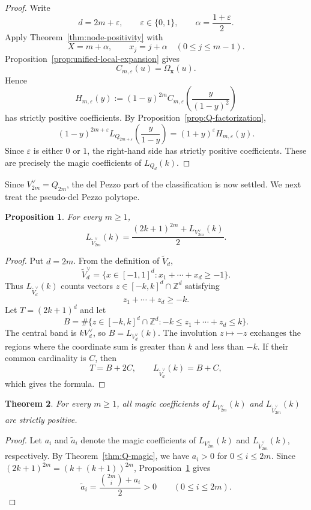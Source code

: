 \documentclass[10pt,a4paper]{amsart}
\newtheorem{Theorem}{Theorem}[section]
\newtheorem{Proposition}[Theorem]{Proposition}
\theoremstyle{definition}
\newcommand{\ZZ}{\mathbb Z}
\begin{document}
\begin{proof}
Write
\[
d=2m+\varepsilon,
\qquad
\varepsilon\in\{0,1\},
\qquad
\alpha=\frac{1+\varepsilon}{2}.
\]
Apply Theorem~\ref{thm:node-positivity} with
\[
X=m+\alpha,
\qquad
x_j=j+\alpha
\quad(0\le j\le m-1).
\]
Proposition~\ref{prop:unified-local-expansion} gives
\[
C_{m,\varepsilon}(u)=\Omega_{\mathbf x}(u).
\]
Hence
\[
H_{m,\varepsilon}(y)
:=
(1-y)^{2m}
C_{m,\varepsilon}\left(\frac{y}{(1-y)^2}\right)
\]
has strictly positive coefficients.  By
Proposition~\ref{prop:Q-factorization},
\[
(1-y)^{2m+\varepsilon}
L_{Q_{2m+\varepsilon}}\left(\frac{y}{1-y}\right)
=
(1+y)^\varepsilon
H_{m,\varepsilon}(y).
\]
Since $\varepsilon$ is either $0$ or $1$, the right-hand side has strictly
positive coefficients.  These are precisely the magic coefficients of
$L_{Q_d}(k)$.
\end{proof}

Since $V_{2m}^\vee=Q_{2m}$, the del Pezzo part of the classification is now
settled.  We next treat the pseudo-del Pezzo polytope.

\begin{Proposition}\label{prop:pseudo-average}
For every $m\ge1$,
\[
L_{\widetilde V_{2m}^\vee}(k)
=
\frac{(2k+1)^{2m}+L_{V_{2m}^\vee}(k)}2.
\]
\end{Proposition}

\begin{proof}
Put $d=2m$.  From the definition of $\widetilde V_d$,
\[
\widetilde V_d^\vee
=
\{x\in[-1,1]^d:x_1+\cdots+x_d\ge-1\}.
\]
Thus $L_{\widetilde V_d^\vee}(k)$ counts vectors
$z\in[-k,k]^d\cap\ZZ^d$ satisfying
\[
z_1+\cdots+z_d\ge-k.
\]
Let $T=(2k+1)^d$ and let
\[
B
=
\#\{z\in[-k,k]^d\cap\ZZ^d:
-k\le z_1+\cdots+z_d\le k\}.
\]
The central band is $kV_d^\vee$, so $B=L_{V_d^\vee}(k)$.  The involution
$z\mapsto-z$ exchanges the regions where the coordinate sum is greater
than $k$ and less than $-k$.  If their common cardinality is $C$, then
\[
T=B+2C,
\qquad
L_{\widetilde V_d^\vee}(k)=B+C,
\]
which gives the formula.
\end{proof}

\begin{Theorem}\label{thm:building-blocks}
For every $m\ge1$, all magic coefficients of
$L_{V_{2m}^\vee}(k)$ and $L_{\widetilde V_{2m}^\vee}(k)$
are strictly positive.
\end{Theorem}

\begin{proof}
Let $a_i$ and $\widetilde a_i$ denote the magic coefficients of
$L_{V_{2m}^\vee}(k)$ and $L_{\widetilde V_{2m}^\vee}(k)$,
respectively.
By Theorem~\ref{thm:Q-magic}, we have $a_i>0$ for $0\le i\le2m$.
Since $(2k+1)^{2m}=(k+(k+1))^{2m}$,
Proposition~\ref{prop:pseudo-average} gives
\[
\widetilde a_i
=
\frac{\binom{2m}{i}+a_i}{2}>0
\qquad(0\le i\le2m).
\]
\end{proof}
\end{document}
